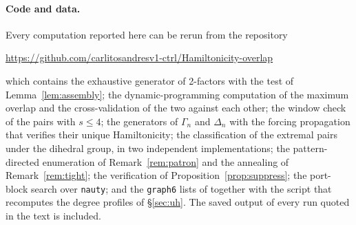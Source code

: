 \documentclass[11pt,a4paper]{article}
\theoremstyle{definition}
\theoremstyle{remark}
\begin{document}
\paragraph{Code and data.} Every computation reported here can be rerun from the repository
\begin{center}
\url{https://github.com/carlitosandresv1-ctrl/Hamiltonicity-overlap}
\end{center}
which contains the exhaustive generator of 2-factors with the test of Lemma~\ref{lem:assembly}; the dynamic-programming computation of the maximum overlap and the cross-validation of the two against each other; the window check of the pairs with $s\le4$; the generators of $\Gamma_n$ and $\Delta_n$ with the forcing propagation that verifies their unique Hamiltonicity; the classification of the extremal pairs under the dihedral group, in two independent implementations; the pattern-directed enumeration of Remark~\ref{rem:patron} and the annealing of Remark~\ref{rem:tight}; the verification of Proposition~\ref{prop:suppress}; the port-block search over \texttt{nauty}; and the \texttt{graph6} lists of \cite{hog} together with the script that recomputes the degree profiles of \S\ref{sec:uh}. The saved output of every run quoted in the text is included.
\end{document}
